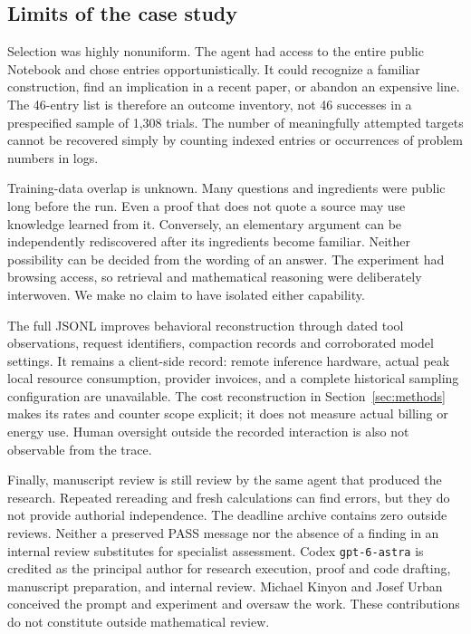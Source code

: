 \subsection{Limits of the case study}

Selection was highly nonuniform. The agent had access to the entire
public Notebook and chose entries opportunistically. It could recognize
a familiar construction, find an implication in a recent paper, or
abandon an expensive line. The 46-entry list is therefore an outcome
inventory, not 46 successes in a prespecified sample of 1,308 trials.
The number of meaningfully attempted targets cannot be recovered simply
by counting indexed entries or occurrences of problem numbers in logs.

Training-data overlap is unknown. Many questions and ingredients were
public long before the run. Even a proof that does not quote a source
may use knowledge learned from it. Conversely, an elementary argument
can be independently rediscovered after its ingredients become familiar.
Neither possibility can be decided from the wording of an answer.
The experiment had browsing access, so retrieval and mathematical
reasoning were deliberately interwoven. We make no claim to have
isolated either capability.

The full JSONL improves behavioral reconstruction through dated tool
observations, request identifiers, compaction records and corroborated
model settings. It remains a client-side record: remote inference
hardware, actual peak local resource consumption, provider invoices,
and a complete historical sampling configuration are unavailable.
The cost reconstruction in Section~\ref{sec:methods} makes its rates
and counter scope explicit; it does not measure actual billing or
energy use. Human oversight outside the recorded interaction is also
not observable from the trace.

Finally, manuscript review is still review by the same agent that
produced the research. Repeated rereading and fresh calculations can
find errors, but they do not provide authorial independence. The
deadline archive contains zero outside reviews. Neither a preserved
PASS message nor the absence of a finding in an internal review
substitutes for specialist assessment. Codex \texttt{gpt-6-astra} is
credited as the principal author for research execution, proof and code
drafting, manuscript preparation, and internal review. Michael Kinyon
and Josef Urban conceived the prompt and experiment and oversaw the
work. These contributions do not constitute outside mathematical review.

